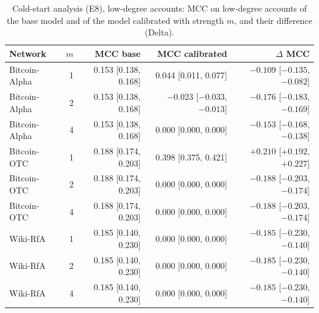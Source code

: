 \begin{table}[!t]
\centering
\scriptsize
\setlength{\tabcolsep}{3pt}
\caption{Cold-start analysis (E8), low-degree accounts: MCC on low-degree accounts of the base model and of the model calibrated with strength $m$, and their difference (Delta).}
\label{tab:s_s_self_term_e8_mcc}
\begin{tabular}{@{}lrrrr@{}}
\toprule
\textbf{Network} & \textbf{$m$} & \textbf{MCC base} & \textbf{MCC calibrated} & \textbf{$\Delta$ MCC} \\
\midrule
Bitcoin-Alpha & 1 & 0.153 [0.138, 0.168] & 0.044 [0.011, 0.077] & $-0.109$ [$-0.135$, $-0.082$] \\
Bitcoin-Alpha & 2 & 0.153 [0.138, 0.168] & $-0.023$ [$-0.033$, $-0.013$] & $-0.176$ [$-0.183$, $-0.169$] \\
Bitcoin-Alpha & 4 & 0.153 [0.138, 0.168] & 0.000 [0.000, 0.000] & $-0.153$ [$-0.168$, $-0.138$] \\
Bitcoin-OTC & 1 & 0.188 [0.174, 0.203] & 0.398 [0.375, 0.421] & $+0.210$ [$+0.192$, $+0.227$] \\
Bitcoin-OTC & 2 & 0.188 [0.174, 0.203] & 0.000 [0.000, 0.000] & $-0.188$ [$-0.203$, $-0.174$] \\
Bitcoin-OTC & 4 & 0.188 [0.174, 0.203] & 0.000 [0.000, 0.000] & $-0.188$ [$-0.203$, $-0.174$] \\
Wiki-RfA & 1 & 0.185 [0.140, 0.230] & 0.000 [0.000, 0.000] & $-0.185$ [$-0.230$, $-0.140$] \\
Wiki-RfA & 2 & 0.185 [0.140, 0.230] & 0.000 [0.000, 0.000] & $-0.185$ [$-0.230$, $-0.140$] \\
Wiki-RfA & 4 & 0.185 [0.140, 0.230] & 0.000 [0.000, 0.000] & $-0.185$ [$-0.230$, $-0.140$] \\
\bottomrule
\end{tabular}
\end{table}
